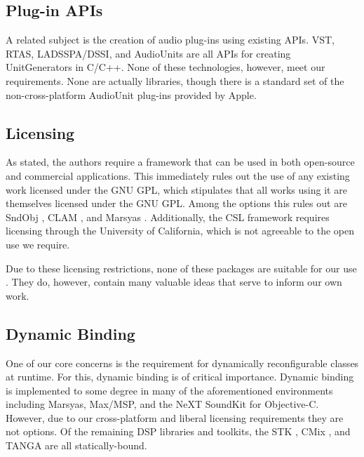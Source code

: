 \documentclass[twoside,10pt]{article}
\begin{document}


\subsection{Plug-in APIs} %

A related subject is the creation of audio plug-ins using existing APIs.  VST, RTAS, LADSSPA/DSSI, and AudioUnits are all APIs for creating UnitGenerators in C/C++.  None of these technologies, however, meet our requirements.  None are actually libraries, though there is a standard set of the non-cross-platform AudioUnit plug-ins provided by Apple.



\subsection{Licensing} %

As stated, the authors require a framework that can be used in both open-source and commercial applications.  This immediately rules out the use of any existing work licensed under the GNU GPL, which stipulates that all works using it are themselves licensed under the GNU GPL.  Among the options this rules out are SndObj \cite{Lazzarini:2001}, CLAM \cite{Amatraian:2008}, and Marsyas \cite{Tzanetakis:2008}.  Additionally, the CSL framework \cite{Pope:2003} requires licensing through the University of California, which is not agreeable to the open use we require.

Due to these licensing restrictions, none of these packages are suitable for our use
.  They do, however, contain many valuable ideas that serve to inform our own work.



\subsection{Dynamic Binding} %

One of our core concerns is the requirement for dynamically reconfigurable classes at runtime.  For this, dynamic binding is of critical importance.  Dynamic binding is implemented to some degree in many of the aforementioned environments including Marsyas, Max/MSP, and the NeXT SoundKit for Objective-C.  However, due to our cross-platform and liberal licensing requirements they are not options.  Of the remaining DSP libraries and toolkits, the STK \cite{Cook:1999}, CMix \cite{Lansky:1990}, and TANGA \cite{Reiter:2007} are all statically-bound.  
\end{document}
